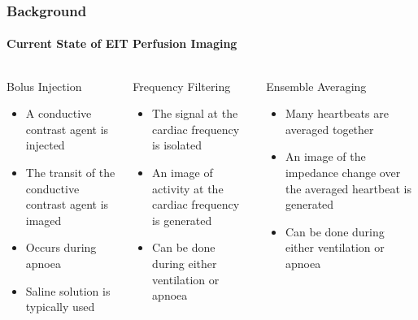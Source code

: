 \documentclass[10pt,    %
    english,            %
    xcolor=table,       %
    envcountsect,        %
    aspectratio=1610
]{beamer}
\begin{document}
\begin{frame}
	\frametitle{Background}
	\framesubtitle{Current State of EIT Perfusion Imaging}
	\begin{columns}[c]
		\begin{column}{0.33\textwidth}
			\alert{\large Bolus Injection} \\ \vspace{2mm}
			\begin{itemize}
				\item A conductive contrast agent is injected
				\item The transit of the conductive contrast agent is imaged
				\vspace{3mm}
				\item Occurs during apnoea
				\item Saline solution is typically used 
			\end{itemize}
		\end{column}
		\begin{column}{0.33\textwidth}
			\alert{\large Frequency Filtering} \\ \vspace{2mm}
			\begin{itemize}
				\item The signal at the cardiac frequency is isolated
				\item An image of activity at the cardiac frequency is generated
				\item Can be done during either ventilation or apnoea
			\end{itemize}
		\end{column}
		\begin{column}{0.33\textwidth}
			\alert{\large Ensemble Averaging} \\ \vspace{2mm}
			\begin{itemize}
				\item Many heartbeats are averaged together 
				\item An image of the impedance change over the averaged heartbeat is generated
				\item Can be done during either ventilation or apnoea
			\end{itemize}
		\end{column}
		\end{columns}
\end{frame}
\end{document}
